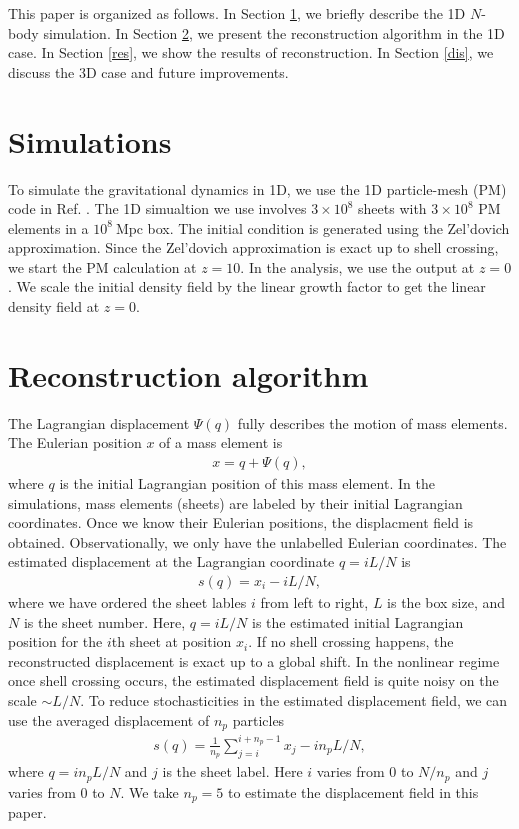 \documentclass[aps,prd,twocolumn,showpacs,superscriptaddress,groupedaddress,nofootinbib]{revtex4}  %
\newcommand{\mr}{\mathrm}
\newcommand{\bea}{\begin{eqnarray}}
\newcommand{\eea}{\end{eqnarray}}
\begin{document}
This paper is organized as follows. In Section \ref{sim}, we briefly describe 
the 1D $N$-body simulation. In Section \ref{rec}, we present the reconstruction 
algorithm in the 1D case. In Section \ref{res}, we show the results of
reconstruction.
In Section \ref{dis}, we discuss the 3D case and future improvements.


\section{Simulations}
\label{sim}
To simulate the gravitational dynamics in 1D, we use the 
1D particle-mesh (PM) code in Ref. \cite{2016matt}.
The 1D simualtion we use involves $3\times10^8$ sheets with $3\times10^8$ PM
elements in a $10^8\ \mr{Mpc}$ box.
The initial condition is generated using the Zel'dovich approximation.
Since the Zel'dovich approximation is exact up to shell crossing, we start 
the PM calculation at $z=10$. In the analysis, we use the output at $z=0$.
We scale the initial density field by the linear growth factor to get the
linear density field at $z=0$.


\section{Reconstruction algorithm}
\label{rec}
The Lagrangian displacement 
${\Psi}({q})$ fully describes the motion of mass elements.
The Eulerian position ${x}$ of a mass element is
\bea
{x}={q}+{\Psi}({q}),
\eea
where ${q}$ is the initial Lagrangian position of this mass element.
In the simulations, mass elements (sheets) are labeled by their initial 
Lagrangian coordinates. Once we know their Eulerian positions, the displacment 
field is obtained. Observationally, we only have the unlabelled Eulerian 
coordinates. 
The estimated displacement at the Lagrangian coordinate $q=iL/N$ is 
\bea
s(q)=x_i-iL/N,
\eea
where we have ordered the sheet lables $i$ from left to right, $L$ is the box
size, and $N$ is the sheet number. 
Here, $q=iL/N$ is the estimated initial Lagrangian position for the $i$th sheet
at position $x_i$.
If no shell crossing happens, the reconstructed displacement is exact up to
a global shift. In the nonlinear regime once shell crossing occurs, the 
estimated displacement field is quite noisy on the scale $\sim L/N$.
To reduce stochasticities in the estimated displacement field, we can use the
averaged displacement of $n_p$ particles 
\bea
s(q)=\frac{1}{n_p}\sum_{j=i}^{i+n_p-1}x_{j}-in_pL/N,
\eea
where $q=in_pL/N$ and $j$ is the sheet label. 
Here $i$ varies from $0$ to $N/n_p$ and $j$ varies from $0$ to $N$.
We take $n_p=5$ to estimate the displacement field in this paper.
\end{document}

